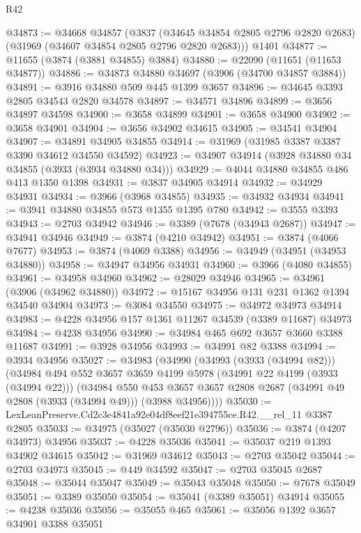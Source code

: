\begin{lexlean}{R42}
\begin{coremodule}
@34873 := @34668
    @34857
    (@3837 (@34645 @34854 @2805 @2796 @2820 @2683) (@31969 (@34607 @34854 @2805 @2796 @2820 @2683)))
    @1401
@34877 := @11655 (@3874 (@3881 @34855) @3884)
@34880 := @22090 (@11651 (@11653 @34877))
@34886 := @34873 @34880 @34697 (@3906 (@34700 @34857 @3884))
@34891 := @3916 @34880 @509 @445 @1399 @3657
@34896 := @34645 @3393 @2805 @34543 @2820 @34578
@34897 := @34571 @34896
@34899 := @3656 @34897 @34598
@34900 := @3658 @34899
@34901 := @3658 @34900
@34902 := @3658 @34901
@34904 := @3656 @34902 @34615
@34905 := @34541 @34904
@34907 := @34891 @34905 @34855
@34914 := @31969 (@31985 @3387 @3387 @3390 @34612 @34550 @34592)
@34923 := @34907 @34914 (@3928 @34880 @34 @34855 (@3933 (@3934 @34880 @34)))
@34929 := @4044 @34880 @34855 @486 @413 @1350 @1398
@34931 := @3837 @34905 @34914
@34932 := @34929 @34931
@34934 := @3966 (@3968 @34855)
@34935 := @34932 @34934
@34941 := @3941 @34880 @34855 @573 @1355 @1395 @780
@34942 := @3555 @3393
@34943 := @2703 @34942
@34946 := @3389 (@7678 (@34943 @2687))
@34947 := @34941 @34946
@34949 := @3874 (@4210 @34942)
@34951 := @3874 (@4066 @7677)
@34953 := @3874 (@4069 @3388)
@34956 := @34949 (@34951 (@34953 @34880))
@34958 := @34947 @34956 @34931
@34960 := @3966 (@4080 @34855)
@34961 := @34958 @34960
@34962 := @28029 @34946
@34965 := @34961 (@3906 (@34962 @34880))
@34972 := @15167 @34956 @131 @231 @1362 @1394 @34540 @34904
@34973 := @3084 @34550
@34975 := @34972 @34973 @34914
@34983 := @4228 @34956 @157 @1361 @11267 @34539 (@3389 @11687) @34973
@34984 := @4238 @34956
@34990 := @34984 @465 @692 @3657 @3660 @3388 @11687
@34991 := @3928 @34956
@34993 := @34991 @82 @3388
@34994 := @3934 @34956
@35027 := @34983
    (@34990
      (@34993 (@3933 (@34994 @82)))
      (@34984
        @494
        @552
        @3657
        @3659
        @4199
        @5978
        (@34991 @22 @4199 (@3933 (@34994 @22)))
        (@34984
          @550
          @453
          @3657
          @3657
          @2808
          @2687
          (@34991 @49 @2808 (@3933 (@34994 @49)))
          (@3988 @34956))))
@35030 := LexLeanPreserve.Cd2c3e4841a92e04df8eef21e394755ce.R42.__rel_11 @3387 @2805
@35033 := @34975 (@35027 (@35030 @2796))
@35036 := @3874 (@4207 @34973) @34956
@35037 := @4228 @35036
@35041 := @35037 @219 @1393 @34902 @34615
@35042 := @31969 @34612
@35043 := @2703 @35042
@35044 := @2703 @34973
@35045 := @449 @34592
@35047 := @2703 @35045 @2687
@35048 := @35044 @35047
@35049 := @35043 @35048
@35050 := @7678 @35049
@35051 := @3389 @35050
@35054 := @35041 (@3389 @35051) @34914
@35055 := @4238 @35036
@35056 := @35055 @465
@35061 := @35056 @1392 @3657 @34901 @3388 @35051

\end{coremodule}
\end{lexlean}
